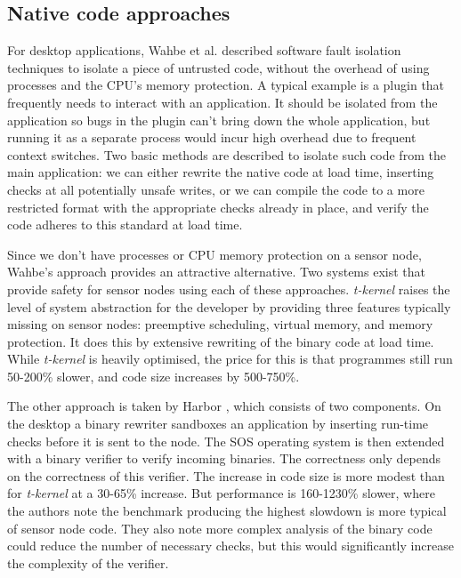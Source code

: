 \subsection{Native code approaches}
For desktop applications, Wahbe et al. described software fault isolation \cite{Wahbe:1994cj} techniques to isolate a piece of untrusted code, without the overhead of using processes and the CPU's memory protection. A typical example is a plugin that frequently needs to interact with an application. It should be isolated from the application so bugs in the plugin can't bring down the whole application, but running it as a separate process would incur high overhead due to frequent context switches. Two basic methods are described to isolate such code from the main application: we can either rewrite the native code at load time, inserting checks at all potentially unsafe writes, or we can compile the code to a more restricted format with the appropriate checks already in place, and verify the code adheres to this standard at load time.

Since we don't have processes or CPU memory protection on a sensor node, Wahbe's approach provides an attractive alternative. Two systems exist that provide safety for sensor nodes using each of these approaches. \emph{t-kernel} raises the level of system abstraction for the developer by providing three features typically missing on sensor nodes: preemptive scheduling, virtual memory, and memory protection. It does this by extensive rewriting of the binary code at load time. While \emph{t-kernel} is heavily optimised, the price for this is that programmes still run 50-200\% slower, and code size increases by 500-750\%.

The other approach is taken by Harbor \cite{Kumar:2007ge}, which consists of two components. On the desktop a binary rewriter sandboxes an application by inserting run-time checks before it is sent to the node. The SOS operating system \cite{Han:2005th} is then extended with a binary verifier to verify incoming binaries. The correctness only depends on the correctness of this verifier. The increase in code size is more modest than for \emph{t-kernel} at a 30-65\% increase. But performance is 160-1230\% slower, where the authors note the benchmark producing the highest slowdown is more typical of sensor node code. They also note more complex analysis of the binary code could reduce the number of necessary checks, but this would significantly increase the complexity of the verifier.

